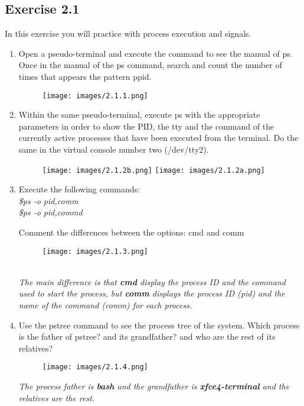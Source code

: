\documentclass[12pt, titlepage,]{article}
\begin{document}
\subsection{Exercise 2.1}
In this exercise you will practice with process execution and signals. \par
\begin{enumerate}
    \item Open a pseudo-terminal and execute the command to see the manual of ps. Once in the manual of the ps command, search and count the number of times that appears the pattern ppid.
    \begin{figure}[h] %
    \centering
    {\texttt{[image: images/2.1.1.png]}}
    \end{figure}
    
  \item Within the same pseudo-terminal, execute ps with the appropriate parameters in order to show the PID, the tty and the command of the currently active processes that have been executed from the terminal. Do the same in the virtual console number two (/dev/tty2).
    \begin{figure}[h] %
    \centering
    {\texttt{[image: images/2.1.2b.png]}}
    {\texttt{[image: images/2.1.2a.png]}}
    \end{figure}

  \item Execute the following commands:\\
 \textit{\color{gray}  \$ps -o pid,comm\\
    \$ps -o pid,commd}

   Comment the differences between the options: cmd and comm    
    \begin{figure}[h] %
    \centering
    {\texttt{[image: images/2.1.3.png]}}
    \end{figure}\\
    \textit{\color{blue}The main difference is that \textbf{cmd} display the process ID and the command used to start the process, but  \textbf{comm} displays the process ID (pid) and the name of the command (comm) for each process. }
    \clearpage  
  \item Use the pstree command to see the process tree of the system. Which process is the father of pstree? and its grandfather? and who are the rest of its relatives? 

    \begin{figure}[h] %
    \centering
    {\texttt{[image: images/2.1.4.png]}}
    \end{figure}
    \textit{\color{blue} The process father is \textbf{bash} and the grandfather is \textbf{xfce4-terminal} and the relatives are the rest.}
    

\end{enumerate}
\end{document}
